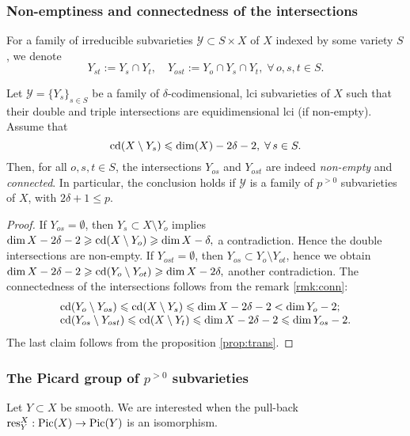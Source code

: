 \documentclass[11pt,reqno]{amsart}
\let\cal\mathcal
\numberwithin{equation}{section}
\numberwithin{figure}{section}
\let\sm\setminus
\let\ges\geqslant
\let\les\leqslant
\begin{document}
\subsubsection{Non-emptiness and connectedness of the intersections}\label{sssct:conn} 

For a family of irreducible subvarieties ${{\cal Y}}\subset S\times X$ of $X$ indexed by some 
variety $S$, we denote 
\begin{equation}\label{eq:ost}
Y_{st}:=Y_s\cap Y_t,\quad Y_{ost}:=Y_o\cap Y_s\cap Y_t,\;\forall\,o,s,t\in S.
\end{equation}

\begin{m-lemma}\label{lm:yy'} 
Let ${{\cal Y}}=\{Y_s\}_{s\in S}$ be a family of $\delta$-codimensional, lci subvarieties 
of $X$ such that their double and triple intersections are equidimensional lci 
(if non-empty). Assume that 
$$
{{\rm cd}}(X\sm Y_s)\les\dim(X)-2\delta-2,\;\forall\,s\in S.
$$
Then, for all $o,s,t\in S$, the intersections $Y_{os}$ and $Y_{ost}$ are indeed 
\emph{non-empty} and \emph{connected}.  
In particular, the conclusion holds if ${{\cal Y}}$ is a family 
of $p^{{>0}}$ subvarieties of $X$, with $2\delta+1\les p$.
\end{m-lemma}

\begin{proof}
If $Y_{os}=\emptyset$, then $Y_s\subset X\sm Y_o$ implies 
$\dim X-2\delta-2\ges{{\rm cd}}(X\sm Y_o)\ges\dim X-\delta,$ a contradiction. 
Hence the double intersections are non-empty. 
If $Y_{ost}=\emptyset$, then $Y_{os}\subset Y_o\sm Y_{ot}$, hence 
we obtain $\dim X-2\delta-2\ges{{\rm cd}}(Y_o\sm Y_{ot})\ges\dim X-2\delta,$ 
another contradiction. 
The connectedness of the intersections follows from the remark \ref{rmk:conn}: 
$$
\begin{array}{l}
{{\rm cd}}(Y_o\sm Y_{os})\les{{\rm cd}}(X\sm Y_s)\les\dim X-2\delta-2<\dim Y_o-2;
\\ 
{{\rm cd}}(Y_{os}\sm Y_{ost})\les{{\rm cd}}(X\sm Y_t)\les\dim X-2\delta-2\les\dim Y_{os}-2.
\end{array}
$$
The last claim follows from the proposition \ref{prop:trans}.  
\end{proof}

\subsubsection{The Picard group of $p^{{>0}}$ subvarieties}\label{sssct:pic}

Let $Y\subset X$ be smooth. We are interested when the pull-back 
${{\rm res}}^X_Y:{\mathop{\rm Pic}\nolimits}(X)\to{\mathop{\rm Pic}\nolimits}(Y)$ is an isomorphism. 
\end{document}
